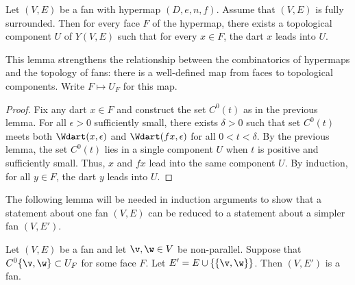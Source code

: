 \begin{lemma} \label{lemma:UF}
Let $(V,E)$ be a fan with hypermap $(D,e,n,f)$.  Assume that $(V,E)$
is fully surrounded.  Then for every face $F$ of the hypermap, there
exists a topological component $U$ of $Y(V,E)$ such that for every
$x\in F$, the dart $x$ leads into $U$.
\end{lemma}
%
%
%

This lemma strengthens the relationship between the
combinatorics of hypermaps and the topology of fans: there is a
well-defined map from faces to topological components.  Write
$F\mapsto U_F$ for this map.
%

\begin{proof} Fix any dart $x\in F$ and construct the set $C^0(t)$ as
in the previous lemma.  For all $\epsilon>0$ sufficiently small,
there exists $\delta>0$ such that set $C^0(t)$ meets both
$\Wdart(x,\epsilon)$ and $\Wdart(f x,\epsilon)$ for all
$0<t<\delta$.  By the previous lemma, the set $C^0(t)$ lies in a
single component $U$ when $t$ is positive and sufficiently small.
Thus, $x$ and $f x$ lead into the same component $U$.  By induction,
for all $y\in F$, the dart $y$ leads into $U$.
\end{proof}

The following lemma will be needed in induction arguments to show
that a statement about one fan $(V,E)$ can be reduced to a statement
about a simpler fan $(V,E')$.

\begin{lemma}\label{lemma:add-edge}
Let $(V,E)$ be a fan and let $\v,\w\in V$ be non-parallel.  Suppose
that $C^0\{\v,\w\}\subset U_F$ for some face $F$.  Let $E' =
E\cup\{\{\v,\w\}\}$.  Then $(V,E')$ is a fan.
\end{lemma}

